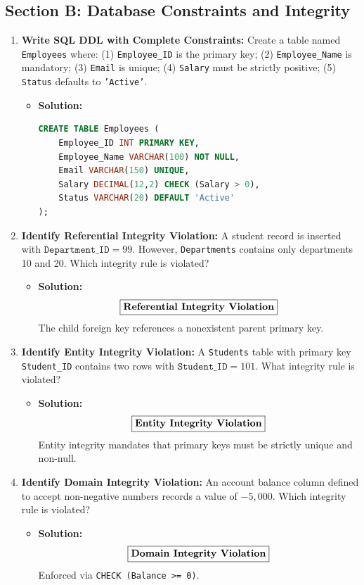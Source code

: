 \subsection{Section B: Database Constraints and Integrity}

\begin{enumerate}[label=\textbf{Problem \arabic*.,resume},leftmargin=1.5cm]
\item \textbf{Write SQL DDL with Complete Constraints:}
Create a table named \texttt{Employees} where: (1) \texttt{Employee\_ID} is the primary key; (2) \texttt{Employee\_Name} is mandatory; (3) \texttt{Email} is unique; (4) \texttt{Salary} must be strictly positive; (5) \texttt{Status} defaults to \texttt{'Active'}.
\begin{itemize}
\item \textbf{Solution:}
\begin{lstlisting}[language=SQL]
CREATE TABLE Employees (
    Employee_ID INT PRIMARY KEY,
    Employee_Name VARCHAR(100) NOT NULL,
    Email VARCHAR(150) UNIQUE,
    Salary DECIMAL(12,2) CHECK (Salary > 0),
    Status VARCHAR(20) DEFAULT 'Active'
);
\end{lstlisting}
\end{itemize}

\item \textbf{Identify Referential Integrity Violation:}
A student record is inserted with $\texttt{Department\_ID} = 99$. However, \texttt{Departments} contains only departments 10 and 20. Which integrity rule is violated?
\begin{itemize}
\item \textbf{Solution:}
\[ \boxed{\text{\textbf{Referential Integrity Violation}}} \]
The child foreign key references a nonexistent parent primary key.
\end{itemize}

\item \textbf{Identify Entity Integrity Violation:}
A \texttt{Students} table with primary key \texttt{Student\_ID} contains two rows with $\texttt{Student\_ID} = 101$. What integrity rule is violated?
\begin{itemize}
\item \textbf{Solution:}
\[ \boxed{\text{\textbf{Entity Integrity Violation}}} \]
Entity integrity mandates that primary keys must be strictly unique and non-null.
\end{itemize}

\item \textbf{Identify Domain Integrity Violation:}
An account balance column defined to accept non-negative numbers records a value of $-5,000$. Which integrity rule is violated?
\begin{itemize}
\item \textbf{Solution:}
\[ \boxed{\text{\textbf{Domain Integrity Violation}}} \]
Enforced via \texttt{CHECK (Balance >= 0)}.
\end{itemize}
\end{enumerate}

